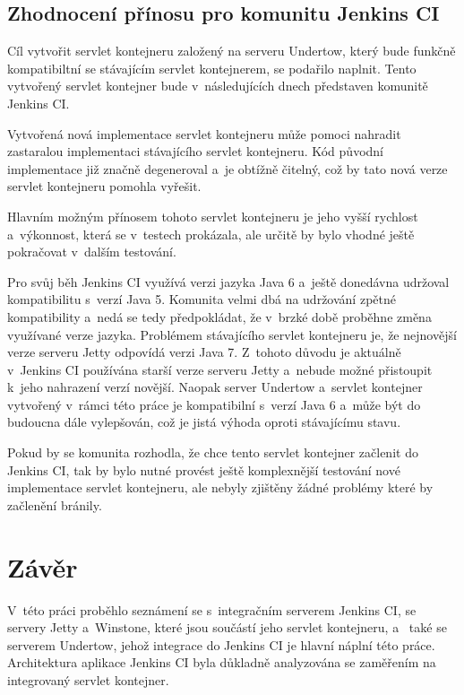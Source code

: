     \section{Zhodnocení přínosu pro komunitu Jenkins CI} \label{kapPrinos}
        Cíl vytvořit servlet kontejneru založený na serveru Undertow, který bude
        funkčně kompatibiltní se stávajícím servlet kontejnerem, se podařilo
        naplnit. Tento vytvořený servlet kontejner bude v~následujících dnech
        představen komunitě Jenkins CI.

        Vytvořená nová implementace servlet kontejneru  
        může pomoci nahradit zastaralou implementaci stávajícího servlet kontejneru.
        Kód původní implementace již značně degeneroval
        a~je obtížně čitelný, což by tato nová verze servlet kontejneru pomohla vyřešit.

        Hlavním možným přínosem tohoto servlet kontejneru je jeho vyšší
        rychlost a~výkonnost, která se v~testech prokázala, ale
        určitě by bylo vhodné ještě pokračovat v~dalším testování.

        Pro svůj běh Jenkins CI využívá verzi jazyka Java 6 a~ještě donedávna
        udržoval kompatibilitu s~verzí Java 5. Komunita
        velmi dbá na udržování zpětné kompatibility
        a~nedá se tedy předpokládat,
        že v~brzké době proběhne změna využívané verze jazyka.
        Problémem stávajícího servlet kontejneru je, že 
        nejnovější verze serveru Jetty odpovídá verzi Java 7.
        Z~tohoto důvodu je aktuálně v~Jenkins CI používána
        starší verze serveru Jetty a~nebude možné přistoupit k~jeho
        nahrazení verzí novější.
        Naopak server Undertow a~servlet kontejner vytvořený v~rámci této práce
        je kompatibilní s~verzí Java 6
        a~může být do budoucna dále vylepšován, což je jistá výhoda oproti stávajícímu
        stavu. 

        Pokud by se komunita rozhodla, že chce tento servlet kontejner
        začlenit do Jenkins CI, tak by bylo nutné provést ještě
        komplexnější testování nové implementace servlet kontejneru, 
        ale nebyly zjištěny žádné
        problémy které by začlenění bránily.
    


\chapter{Závěr}
    V~této práci proběhlo seznámení se s~integračním serverem Jenkins CI,
    se servery Jetty a~Winstone, které jsou součástí jeho servlet kontejneru,
    a~ také se serverem Undertow, jehož integrace do Jenkins CI je hlavní
    náplní této práce. Architektura aplikace Jenkins CI byla
    důkladně analyzována se zaměřením na integrovaný
    servlet kontejner.


